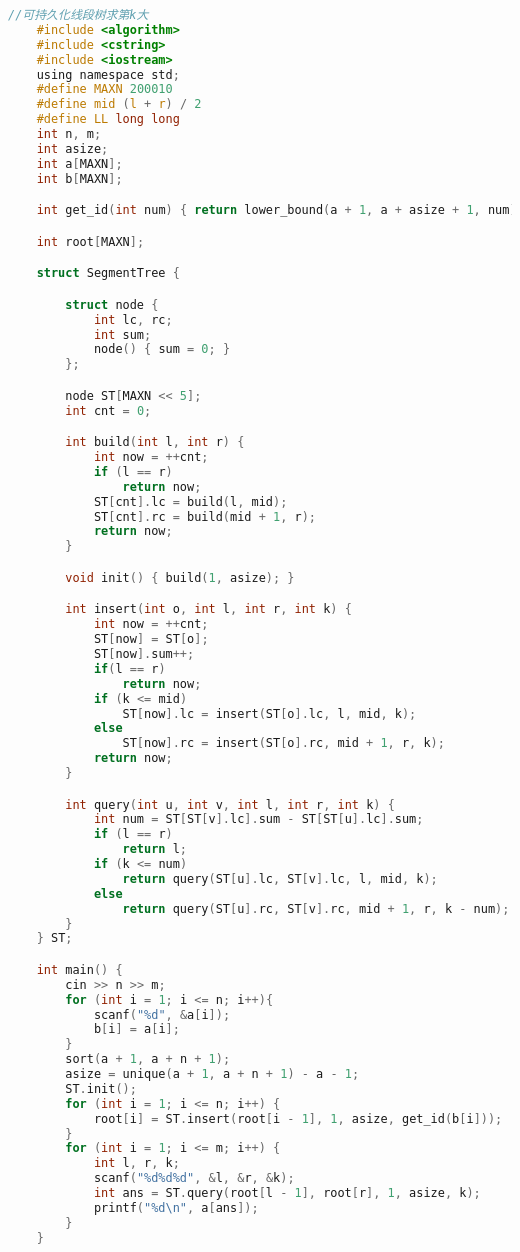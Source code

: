 \documentclass[]{article}
\begin{document}
\begin{lstlisting}[language={c}]
    //可持久化线段树求第k大
    #include <algorithm>
    #include <cstring>
    #include <iostream>
    using namespace std;
    #define MAXN 200010
    #define mid (l + r) / 2
    #define LL long long
    int n, m;
    int asize;
    int a[MAXN];
    int b[MAXN];

    int get_id(int num) { return lower_bound(a + 1, a + asize + 1, num) - a; }

    int root[MAXN];

    struct SegmentTree {

        struct node {
            int lc, rc;
            int sum;
            node() { sum = 0; }
        };

        node ST[MAXN << 5];
        int cnt = 0;

        int build(int l, int r) {
            int now = ++cnt;
            if (l == r)
                return now;
            ST[cnt].lc = build(l, mid);
            ST[cnt].rc = build(mid + 1, r);
            return now;
        }

        void init() { build(1, asize); }

        int insert(int o, int l, int r, int k) {
            int now = ++cnt;
            ST[now] = ST[o];
            ST[now].sum++;
            if(l == r) 
                return now;
            if (k <= mid)
                ST[now].lc = insert(ST[o].lc, l, mid, k);
            else
                ST[now].rc = insert(ST[o].rc, mid + 1, r, k);
            return now;
        }

        int query(int u, int v, int l, int r, int k) {
            int num = ST[ST[v].lc].sum - ST[ST[u].lc].sum;
            if (l == r)
                return l;
            if (k <= num)
                return query(ST[u].lc, ST[v].lc, l, mid, k);
            else
                return query(ST[u].rc, ST[v].rc, mid + 1, r, k - num);
        }
    } ST;

    int main() {
        cin >> n >> m;
        for (int i = 1; i <= n; i++){
            scanf("%d", &a[i]);
            b[i] = a[i];
        }
        sort(a + 1, a + n + 1);
        asize = unique(a + 1, a + n + 1) - a - 1;
        ST.init();
        for (int i = 1; i <= n; i++) {
            root[i] = ST.insert(root[i - 1], 1, asize, get_id(b[i]));
        }
        for (int i = 1; i <= m; i++) {
            int l, r, k;
            scanf("%d%d%d", &l, &r, &k);
            int ans = ST.query(root[l - 1], root[r], 1, asize, k);
            printf("%d\n", a[ans]);
        }
    }
\end{lstlisting}
\end{document}
